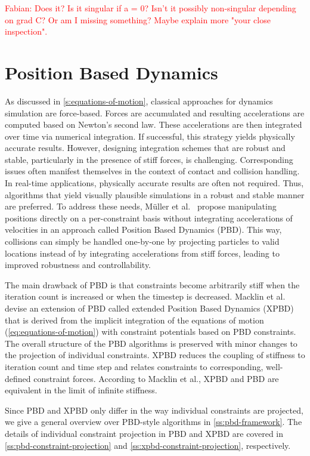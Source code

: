 \textcolor{red}{Fabian: Does it? Is it singular if a = 0? Isn't it possibly non-singular depending on grad C? Or am I missing something? 
Maybe explain more "your close inspection".}

\section{Position Based Dynamics}\label{s:pbd}
As discussed in \cref{s:equations-of-motion}, classical approaches for dynamics simulation are force-based. Forces are accumulated and 
resulting accelerations are computed based on Newton's second law. These accelerations are then integrated over time via numerical integration. 
If successful, this strategy yields physically accurate results. However, designing integration schemes that are robust and stable,
particularly in the presence of stiff forces, is challenging. Corresponding issues often manifest themselves in the context of contact and collision 
handling. In real-time applications, physically accurate results are often not required. Thus, algorithms that yield visually
plausible simulations in a robust and stable manner are preferred. To address these needs, Müller et al.\ \cite{mueller2006} propose manipulating
positions directly on a per-constraint basis without integrating accelerations of velocities in an approach called Position Based Dynamics (PBD).
This way, collisions can simply be handled one-by-one by projecting particles to valid locations instead of by integrating accelerations from 
stiff forces, leading to improved robustness and controllability. 

The main drawback of PBD is that constraints become arbitrarily stiff when the iteration count is increased or when the timestep is decreased.
Macklin et al.\ \cite{macklin2016} devise an extension of PBD called extended Position Based Dynamics (XPBD) that is derived from the implicit
integration of the equations of motion (\cref{eq:equations-of-motion}) with constraint potentials based on PBD constraints. The overall structure 
of the PBD algorithms is preserved with 
minor changes to the projection of individual constraints. XPBD reduces the coupling of stiffness to iteration count and time step and relates 
constraints to corresponding, well-defined constraint forces. According to Macklin et al., XPBD and PBD are equivalent in the limit of infinite
stiffness. 

Since PBD and XPBD only differ in the way individual constraints are projected, we give a general overview over PBD-style algorithms 
in \cref{ss:pbd-framework}. 
The details of individual constraint projection in PBD and XPBD are covered in \cref{ss:pbd-constraint-projection} and 
\cref{ss:xpbd-constraint-projection}, respectively.

